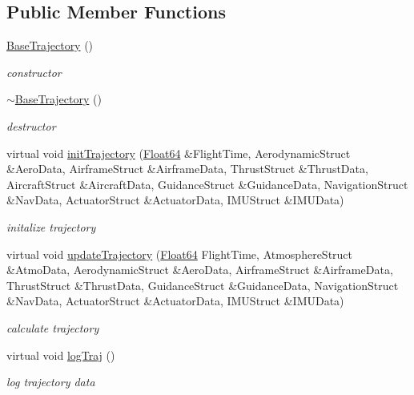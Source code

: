 \subsection*{Public Member Functions}
\begin{DoxyCompactItemize}
\item 
\hyperlink{class_base_trajectory_adeb5dac46dd0e10c53c121abb3cddae2}{Base\+Trajectory} ()
\begin{DoxyCompactList}\small\item\em constructor \end{DoxyCompactList}\item 
\hyperlink{class_base_trajectory_a69beb2e4fc2431d2f150751390bfcfbc}{$\sim$\+Base\+Trajectory} ()
\begin{DoxyCompactList}\small\item\em destructor \end{DoxyCompactList}\item 
virtual void \hyperlink{class_base_trajectory_a4fb09cefd92da44f4e754c8c48f964b5}{init\+Trajectory} (\hyperlink{group___tools_ga3f1431cb9f76da10f59246d1d743dc2c}{Float64} \&Flight\+Time, Aerodynamic\+Struct \&Aero\+Data, Airframe\+Struct \&Airframe\+Data, Thrust\+Struct \&Thrust\+Data, Aircraft\+Struct \&Aircraft\+Data, Guidance\+Struct \&Guidance\+Data, Navigation\+Struct \&Nav\+Data, Actuator\+Struct \&Actuator\+Data, I\+M\+U\+Struct \&I\+M\+U\+Data)
\begin{DoxyCompactList}\small\item\em initalize trajectory \end{DoxyCompactList}\item 
virtual void \hyperlink{class_base_trajectory_a37f0fa46532c754413ee67a846a10624}{update\+Trajectory} (\hyperlink{group___tools_ga3f1431cb9f76da10f59246d1d743dc2c}{Float64} Flight\+Time, Atmosphere\+Struct \&Atmo\+Data, Aerodynamic\+Struct \&Aero\+Data, Airframe\+Struct \&Airframe\+Data, Thrust\+Struct \&Thrust\+Data, Guidance\+Struct \&Guidance\+Data, Navigation\+Struct \&Nav\+Data, Actuator\+Struct \&Actuator\+Data, I\+M\+U\+Struct \&I\+M\+U\+Data)
\begin{DoxyCompactList}\small\item\em calculate trajectory \end{DoxyCompactList}\item 
virtual void \hyperlink{class_base_trajectory_a9e24dc7f487ea46621bd231e9d4d995c}{log\+Traj} ()
\begin{DoxyCompactList}\small\item\em log trajectory data \end{DoxyCompactList}\end{DoxyCompactItemize}


